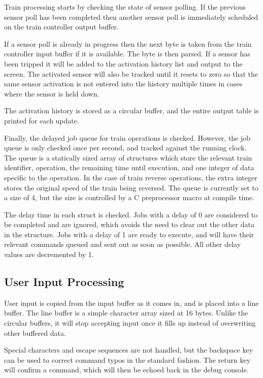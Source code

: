 \documentclass[pdftex,10pt,a4paper]{article}
\begin{document}
Train processing starts by checking the state of sensor polling. If
the previous sensor poll has been completed then another sensor poll
is immediately scheduled on the train controller output buffer.

If a sensor poll is already in progress then the next byte is taken
from the train controller input buffer if it is available. The byte is then
parsed. If a sensor has been tripped it will be added to the
activation history list and output to the screen. The activated sensor
will also be tracked until it resets to zero so that the same sensor
activation is not entered into the history multiple times in cases
where the sensor is held down.

The activation history is stored as a circular buffer, and the entire
output table is printed for each update.

Finally, the delayed job queue for train operations is
checked. However, the job queue is only checked once per second, and
tracked against the running clock. The queue is a statically sized
array of structures which store the relevant train identifier,
operation, the remaining time until execution, and one integer of data
specific to the operation. In the case of train reverse operations,
the extra integer stores the original speed of the train being
reversed. The queue is currently set to a size of 4, but the size is
controlled by a C preprocessor macro at compile time.

The delay time in each struct is checked. Jobs with a delay of 0 are
considered to be completed and are ignored, which avoids the need to
clear out the other data in the structure. Jobs with a delay of 1 are
ready to execute, and will have their relevant commands queued and
sent out as soon as possible. All other delay values are decremented
by 1.

\subsection*{User Input Processing}

User input is copied from the input buffer as it comes in, and is
placed into a line buffer. The line buffer is a simple character array
sized at 16 bytes. Unlike the circular buffers, it will stop accepting
input once it fills up instead of overwriting other buffered data.

Special characters and escape sequences are not handled, but the
backspace key can be used to correct command typos in the standard
fashion. The return key will confirm a command, which will then be
echoed back in the debug console.
\end{document}
